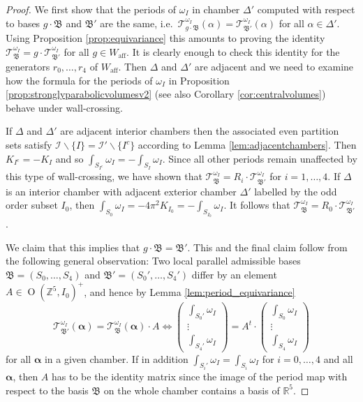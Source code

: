 \documentclass[12pt,letterpaper,reqno]{amsart}
\def\bm#1{#1}%
\theoremstyle{remark}
\theoremstyle{definition}
\numberwithin{thm}{section}
\numberwithin{equation}{section}
\numberwithin{figure}{section}
\newcommand{\R}{\ensuremath{\mathbb R}}
\newcommand{\Z}{\ensuremath{\mathbb Z}}
\newcommand{\bfalpha}{\ensuremath{\bm \alpha}}
\newcommand{\aff}{\mathrm{aff}}
\newcommand{\Simplex}{\Delta}
\DeclareMathOperator{\OO}{O}
\begin{document}
\begin{proof}
We first show that the periods of $\omega_I$ in chamber $\Simplex'$ computed with respect to bases $g \cdot \mathfrak{B}$ and $\mathfrak{B}'$ are the same, i.e.\ $\mathcal{T}^{\omega_I}_{g \cdot \mathfrak{B}}(\bfalpha) = \mathcal{T}^{\omega_I}_{ \mathfrak{B}'}(\bfalpha)$ for all $\bfalpha \in \Simplex'$. Using Proposition \ref{prop:equivariance} this amounts to proving the identity $\mathcal{T}^{\omega_I}_{\mathfrak{B}} = g \cdot \mathcal{T}^{\omega_I}_{\mathfrak{B}'}$ for all $g \in W_\aff$. It is clearly enough to check this identity for the generators $r_0, \ldots, r_4$ of $W_\aff$. Then $\Simplex$ and $\Simplex'$ are adjacent and we need to examine how the formula for the periods of $\omega_I$  in Proposition \ref{prop:stronglyparabolicvolumesv2} (see also Corollary \ref{cor:centralvolumes}) behave under wall-crossing. 

If $\Simplex$ and $\Simplex'$ are adjacent interior chambers then the associated even partition sets satisfy $\mathcal{I}\backslash\{I\}= \mathcal{I}'\backslash \{I^c\}$ according to Lemma \ref{lem:adjacentchambers}. Then $K_{I^c} = - K_I$ and so $\int_{S_{I^c}} \omega_I = - \int_{S_I} \omega_I$. Since all other periods remain unaffected by this type of wall-crossing, we have shown that $\mathcal{T}^{\omega_I}_{\mathfrak{B}} = R_i \cdot \mathcal{T}^{\omega_I}_{\mathfrak{B}'}$ for $i=1, \ldots, 4$. If $\Delta$ is an interior chamber with adjacent exterior chamber $\Delta'$ labelled by the odd order subset $I_0$, then $\int_{S_0} \omega_I = - 4 \pi^2 K_{I_0} = - \int_{S_{I_0}} \omega_I$. It follows that $\mathcal{T}^{\omega_I}_{\mathfrak{B}} = R_0\cdot \mathcal{T}^{\omega_I}_{\mathfrak{B}'}$.

We claim that this implies that $g \cdot \mathfrak{B} = \mathfrak{B}'$. This and the final claim follow from the following general observation: Two local parallel admissible bases $\mathfrak{B}=(S_0, \ldots, S_4)$ and $\mathfrak{B'}=(S_0', \ldots, S_4')$ differ by an element $A \in \OO(\Z^5, I_0)^+$, and hence by Lemma \ref{lem:period_equivariance}
\[
\mathcal{T}_{\mathfrak{B}'}^{\omega_I}( \boldsymbol{\alpha})= \mathcal{T}_{\mathfrak{B}}^{\omega_I}( \boldsymbol{\alpha})\cdot A
\Longleftrightarrow 
\begin{pmatrix}
\int_{S_0'} \omega_I \\ \vdots \\ \int_{S_4'} \omega_I  
\end{pmatrix}
= A^t \cdot
\begin{pmatrix}
\int_{S_0} \omega_I \\ \vdots \\ \int_{S_4} \omega_I 	
\end{pmatrix} 
\]
for all $\boldsymbol{\alpha}$ in a given chamber. If in addition 
$\int_{S_i'} \omega_I = \int_{S_i} \omega_I$ for $i=0, \ldots ,4$ and all $\boldsymbol{\alpha}$, then $A$ has to be the identity matrix since the image of the period map with respect to the basis $\mathfrak{B}$ on the whole chamber contains a basis of $\R^5$. 
\end{proof}
\end{document}
